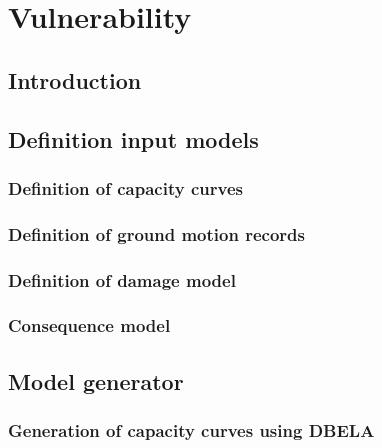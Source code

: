 \chapter{Vulnerability}
\label{chap:vulnerability}

    \section{Introduction}
    

    \section{Definition input models}
    

		\subsection{Definition of capacity curves}
		\label{subsec:cap_curves}
		

		\subsection{Definition of ground motion records}
		\label{subsec:gmrs}
		

		\subsection{Definition of damage model}
		\label{subsec:dmg_model}
		
		
		\subsection{Consequence model}
		\label{subsec:cons_model}
		

	\section{Model generator}
	\label{sec:model-gen}
	

		\subsection{Generation of capacity curves using DBELA}
		\label{subsec:DBELA}
		

